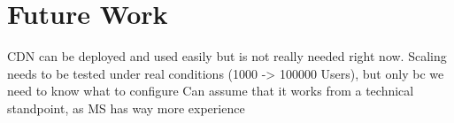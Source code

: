 \documentclass[english]{lni}
\begin{document}
\section{Future Work}
CDN can be deployed and used easily but is not really needed right now. 
Scaling needs to be tested under real conditions (1000 -> 100000 Users), but only bc we need to know what to configure
Can assume that it works from a technical standpoint, as MS has way more experience
\newpage
\appendix



 \newpage
 


%
%

\printbibliography
\end{document}
